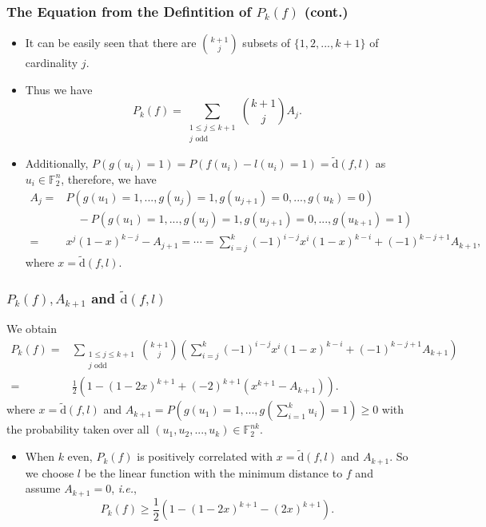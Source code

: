 \documentclass[
    aspectratio=169,                   %
]{beamer}
\newcommand{\F}{\mathbb{F}}
\newcommand{\dis}{\operatorname{\widetilde{d}}}
\begin{document}
    \begin{frame}
        \frametitle{The Equation from the Defintition of $P_k(f)$ (cont.)}
    
        \begin{itemize}
            \item It can be easily seen that there are $\binom{k+1}{j}$ subsets of $\{1,2,...,k+1\}$ of cardinality $j$.
            \item Thus we have \[P_k(f)=\sum_{\substack{1\le j\le k+1\\ j\text{ odd}}} \binom{k+1}{j}A_j.\]
            \item Additionally,  $P(g(u_i)=1)=P(f(u_i)-l(u_i)=1)=\dis(f,l)$ as $u_i\in\F_2^n$, 
            therefore, we have 
            \begin{align*}
                A_j=&P(g(u_1)=1,...,g(u_j)=1,g(u_{j+1})=0,...,g(u_{k})=0)\\
                &\quad-P(g(u_1)=1,...,g(u_j)=1,g(u_{j+1})=0,...,g(u_{k+1})=1)\\
                =&x^j(1-x)^{k-j}-A_{j+1}=\cdots=\sum_{i=j}^{k}(-1)^{i-j}x^i(1-x)^{k-i}+(-1)^{k-j+1}A_{k+1},
            \end{align*}
            where $x=\dis(f,l)$.
        \end{itemize}
    \end{frame}

    \begin{frame}
        \frametitle{$P_k(f), A_{k+1}$ and $\dis(f,l)$}
    
        We obtain 
        \begin{align*}
            P_k(f)=& \sum_{\substack{1\le j\le k+1\\j\text{ odd}}}\binom{k+1}{j}\left( \sum_{i=j}^{k}(-1)^{i-j}x^i(1-x)^{k-i}+(-1)^{k-j+1}A_{k+1} \right)\\
            =&\frac{1}{2}\left( 1-(1-2x)^{k+1}+(-2)^{k+1}(x^{k+1}-A_{k+1}) \right).
        \end{align*}
        where $x=\dis(f,l)$ and $A_{k+1}=P(g(u_1)=1,...,g(\sum_{i=1}^{k}u_i)=1)\ge 0$ with the probability taken over all $(u_1,u_2,...,u_k)\in\F_2^{nk}$.
        \begin{itemize}
            \item When $k$ even, $P_k(f)$ is positively correlated with $x=\dis(f,l)$ and $A_{k+1}$. So we choose $l$ be the linear function with the minimum distance to $f$ and assume $A_{k+1}=0$, \emph{i.e.}, 
            \[P_k(f)\ge\frac{1}{2}\left( 1-(1-2x)^{k+1}-(2x)^{k+1} \right).\]
        \end{itemize}
    \end{frame}
\end{document}
